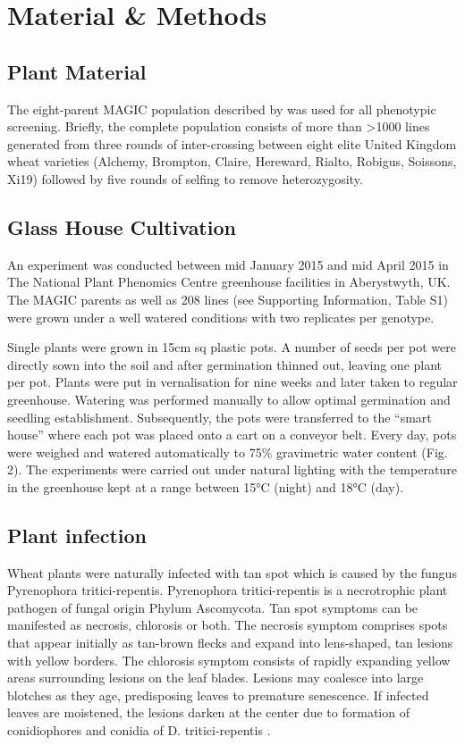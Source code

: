 \documentclass{frontiersSCNS} %
\begin{document}
\section{Material \& Methods}

\subsection{Plant Material}
The eight-parent MAGIC population described by \cite{Mackay01092014} was used for all phenotypic screening. Briefly, the complete population consists of more than >1000 lines generated from three rounds of inter-crossing between eight elite United Kingdom wheat varieties (Alchemy, Brompton, Claire, Hereward, Rialto, Robigus, Soissons, Xi19) followed by five rounds of selfing to remove heterozygosity. 

\subsection{Glass House Cultivation}
An experiment  was conducted between mid January 2015 and mid April 2015 in The National Plant Phenomics Centre greenhouse facilities in Aberystwyth, UK. The MAGIC parents as well as 208 lines (see Supporting Information, Table S1) were grown under a well watered conditions with two replicates per genotype. 

Single plants were grown in 15cm sq plastic pots. A number of seeds per pot were directly sown into the soil and after germination thinned out, leaving one plant per pot. Plants were put in vernalisation for nine weeks and later taken to regular greenhouse. Watering was performed manually to allow optimal germination and seedling establishment. Subsequently, the pots were transferred to the “smart house” where each pot was placed onto a cart on a conveyor belt. Every day, pots were weighed and watered automatically to 75\% gravimetric water content (Fig. 2). The experiments were carried out under natural lighting with the temperature in the greenhouse kept at a range between 15°C (night) and 18°C (day).

\subsection{Plant infection}
Wheat plants were naturally infected with tan spot which is caused by the fungus Pyrenophora tritici-repentis. Pyrenophora tritici-repentis is a necrotrophic plant pathogen of fungal origin Phylum Ascomycota. Tan spot symptoms can be manifested as necrosis, chlorosis or both. The necrosis symptom comprises spots that appear initially as tan-brown flecks and expand into lens-shaped, tan lesions with yellow borders. The chlorosis symptom consists of rapidly expanding yellow areas surrounding lesions on the leaf blades. Lesions may coalesce into large blotches as they age, predisposing leaves to premature senescence.  If infected leaves are moistened, the lesions darken at the center due to formation of conidiophores and conidia of D. tritici-repentis \cite{Singh2009}. 
\end{document}
